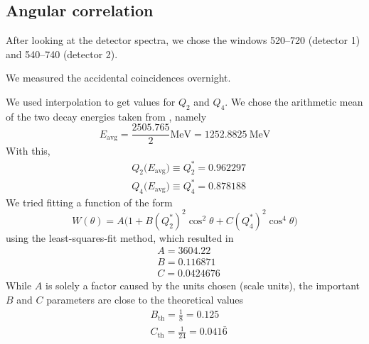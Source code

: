 \documentclass[twocolumn]{article}
\begin{document}
\subsection{Angular correlation}
After looking at the detector spectra, we chose the windows 520--720 (detector 1) and 540--740 (detector 2).
\par We measured the accidental coincidences overnight.
\par We used interpolation to get values for $Q_2$ and $Q_4$. We chose the arithmetic mean of the two decay energies taken from \cite{cobalt_scheme}, namely
\begin{equation}
E_{\text{avg}} = \frac{2505.765}{2} \si{\mega \electronvolt} = \SI{1252.8825}{\mega\electronvolt} \nonumber
\end{equation}
With this,
\begin{align*}
&Q_2\big(E_{\text{avg}}\big) \equiv Q^*_2 = 0.962297\\
&Q_4\big(E_{\text{avg}}\big) \equiv Q^*_4 = 0.878188
\end{align*}
We tried fitting a function of the form
\begin{equation}
W(\theta) = A \big(1 + B (Q^{*}_2)^2 \cos^2 \theta + C (Q^{*}_4)^2 \cos^4 \theta \big) \nonumber
\end{equation} 
using the least-squares-fit method, which resulted in
\begin{align*}
&A = 3604.22\\
&B = 0.116871\\
&C = 0.0424676
\end{align*}
While $A$ is solely a factor caused by the units chosen (scale units), the important $B$ and $C$ parameters are close to the theoretical values
\begin{align*}
&B_{\text{th}} = \frac{1}{8} = 0.125\\
&C_{\text{th}} = \frac{1}{24} = 0.041\bar{6}
\end{align*}

\end{document}
